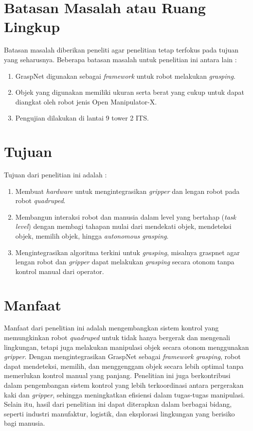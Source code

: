 \section{Batasan Masalah atau Ruang Lingkup}

Batasan masalah diberikan peneliti agar penelitian tetap terfokus pada tujuan yang seharusnya. Beberapa batasan masalah untuk penelitian ini antara lain :

\begin{enumerate}
    \item GraspNet digunakan sebagai \emph{framework} untuk robot melakukan \emph{grasping}.
    \item Objek yang digunakan memiliki ukuran serta berat yang cukup untuk dapat diangkat oleh robot jenis Open Manipulator-X.
    \item Pengujian dilakukan di lantai 9 tower 2 ITS.
\end{enumerate}

\section{Tujuan}

Tujuan dari penelitian ini adalah :

\begin{enumerate}
    \item Membuat \emph{hardware} untuk mengintegrasikan \emph{gripper} dan lengan robot pada robot \emph{quadruped}.
    \item Membangun interaksi robot dan manusia dalam level yang bertahap (\emph{task level})
    dengan membagi tahapan mulai dari mendekati objek, mendeteksi objek, memilih objek, hingga \emph{autonomous grasping}.
    \item Mengintegrasikan algoritma terkini untuk \emph{grasping}, misalnya graspnet agar
    lengan robot dan \emph{gripper} dapat melakukan \emph{grasping} secara otonom tanpa kontrol manual dari operator.
\end{enumerate}

\section{Manfaat}

Manfaat dari penelitian ini adalah mengembangkan sistem kontrol yang memungkinkan
robot \emph{quadruped} untuk tidak hanya bergerak dan mengenali lingkungan,
tetapi juga melakukan manipulasi objek secara otonom menggunakan \emph{gripper}.
Dengan mengintegrasikan GraspNet sebagai \emph{framework grasping}, robot dapat mendeteksi,
memilih, dan menggenggam objek secara lebih optimal tanpa memerlukan kontrol manual yang panjang.
Penelitian ini juga berkontribusi dalam pengembangan sistem kontrol yang lebih terkoordinasi
antara pergerakan kaki dan \emph{gripper}, sehingga meningkatkan efisiensi dalam tugas-tugas manipulasi.
Selain itu, hasil dari penelitian ini dapat diterapkan dalam berbagai bidang,
seperti industri manufaktur, logistik, dan eksplorasi lingkungan yang berisiko bagi manusia.